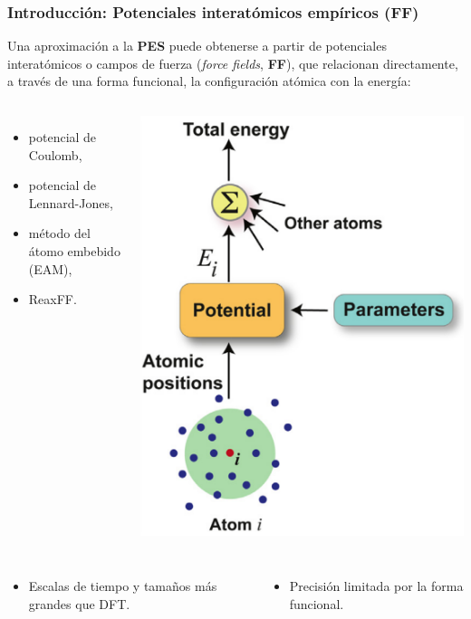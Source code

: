 \documentclass[aspectratio=169]{beamer}
\let\oldtextbf\textbf
\renewcommand{\textbf}[1]{\textcolor{nordblue}{\oldtextbf{#1}}}
\begin{document}
    \begin{frame}
        \frametitle{Introducción: Potenciales interatómicos empíricos (FF)}

        Una aproximación a la \textbf{PES} puede obtenerse a partir de potenciales
        interatómicos o campos de fuerza (\textit{force fields}, \textbf{FF}), que
        relacionan directamente, a través de una forma funcional, la configuración
        atómica con la energía:
        
        \pause

        \begin{columns}
            \begin{itemize}
                \item potencial de Coulomb,
                \item potencial de Lennard-Jones,
                \item método del átomo embebido (EAM),
                \item ReaxFF.
            \end{itemize}
            \begin{center}
                \includegraphics[width=0.45\columnwidth]{intro-ff.png}
            \end{center}
        \end{columns}

        \pause
        
        \begin{columns}
            \begin{itemize}
                \item Escalas de tiempo y tamaños más grandes que DFT.
            \end{itemize}

            \begin{itemize}
                \item Precisión limitada por la forma funcional.
            \end{itemize}
        \end{columns}

	\end{frame}
    
\end{document}
